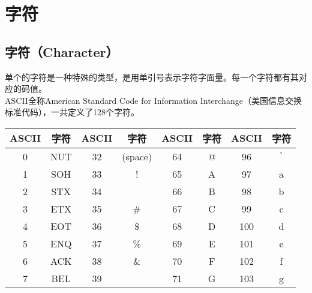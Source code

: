 \newpage

\section{字符}

\subsection{字符（Character）}

单个的字符是一种特殊的类型，是用单引号表示字符字面量。每一个字符都有其对应的码值。 \\

ASCII全称American Standard Code for Information Interchange（美国信息交换标准代码），一共定义了128个字符。

\begin{longtable}{|c|c|c|c|c|c|c|c|}
	\hline
	\textbf{ASCII} & \textbf{字符} & \textbf{ASCII} & \textbf{字符} & \textbf{ASCII} & \textbf{字符}          & \textbf{ASCII} & \textbf{字符}          \\
	\hline
	0              & NUT           & 32             & (space)       & 64             & @                      & 96             & \lstinline|`| \\
	\hline
	1              & SOH           & 33             & !             & 65             & A                      & 97             & a                      \\
	\hline
	2              & STX           & 34             & \text{"}      & 66             & B                      & 98             & b                      \\
	\hline
	3              & ETX           & 35             & \#            & 67             & C                      & 99             & c                      \\
	\hline
	4              & EOT           & 36             & \$            & 68             & D                      & 100            & d                      \\
	\hline
	5              & ENQ           & 37             & \%            & 69             & E                      & 101            & e                      \\
	\hline
	6              & ACK           & 38             & \&            & 70             & F                      & 102            & f                      \\
	\hline
	7              & BEL           & 39             & \text{'}      & 71             & G                      & 103            & g                      \\

\end{longtable}
